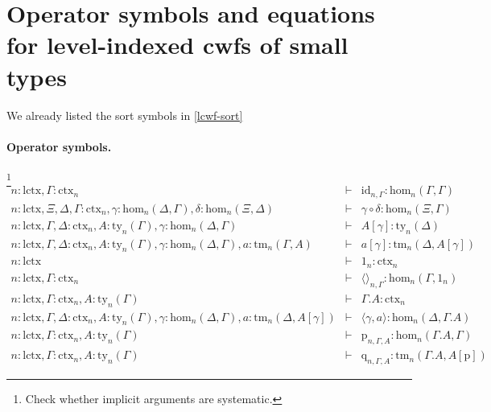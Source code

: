 \documentclass[11pt,a4paper]{article}
\theoremstyle{plain}
\theoremstyle{definition}
\newcommand{\id}{\mathsf{id}}
\def\sub{\mathrm{hom}}
\def\id{\mathrm{id}}
\def\lctx{\mathrm{lctx}}
\def\lp{\mathrm{lp}}
\newcommand{\ctx}{\mathrm{ctx}}
\newcommand{\ty}{\mathrm{ty}}
\newcommand{\tm}{\mathrm{tm}}
\newcommand{\tuple}[1]{\langle #1 \rangle}
\newcommand{\cext}{.}
\def\p{\mathrm{p}}
\def\q{\mathrm{q}}
\begin{document}



\appendix
\section{Operator symbols and equations for level-indexed cwfs of small types}

We already listed the sort symbols in \ref{lcwf-sort}

\paragraph{Operator symbols.} \footnote{Check whether implicit arguments are systematic.}
\begin{eqnarray*}
n : \lctx, \Gamma : \ctx_n &\vdash& \id_{n,\Gamma} : \sub_n(\Gamma,\Gamma)\\
n : \lctx, \Xi,\Delta,\Gamma : \ctx_n, \gamma : \sub_n(\Delta,\Gamma), \delta : \sub_n(\Xi,\Delta) &\vdash&
\gamma \circ \delta : \sub_n(\Xi,\Gamma)\\
n : \lctx, \Gamma,\Delta : \ctx_n, A:\ty_n(\Gamma), \gamma : \sub_n(\Delta,\Gamma) &\vdash&
A[\gamma] : \ty_n(\Delta)\\
n : \lctx, \Gamma,\Delta : \ctx_n, A:\ty_n(\Gamma), \gamma : \sub_n(\Delta,\Gamma), a:\tm_n(\Gamma,A) &\vdash&  a[\gamma] : \tm_n(\Delta,A[\gamma])\\
n : \lctx &\vdash& 1_n : \ctx_n\\
n : \lctx, \Gamma : \ctx_n &\vdash& \tuple{}_{n,\Gamma} : \sub_n(\Gamma,1_n)\\
n : \lctx, \Gamma : \ctx_n, A:\ty_n (\Gamma) &\vdash& \Gamma \cext A : \ctx_n \\
n : \lctx, \Gamma,\Delta : \ctx_n , A:\ty_n (\Gamma), \gamma : \sub_n (\Delta,\Gamma), a:\tm_n (\Delta,A[\gamma]) &\vdash& \tuple{\gamma,a} : \sub_n (\Delta,\Gamma\cext A)\\
n : \lctx, \Gamma : \ctx_n , A:\ty_n (\Gamma) &\vdash& \p_{n,\Gamma,A}: \sub_n (\Gamma\cext A,\Gamma)\\
n : \lctx, \Gamma : \ctx_n , A:\ty_n (\Gamma) &\vdash& \q_{n,\Gamma,A}: \tm_n (\Gamma\cext A,A[\p])
\end{eqnarray*}
\end{document}
